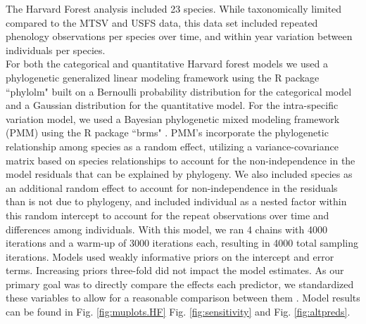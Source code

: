 \documentclass[11pt]{article}
\begin{document}
\noindent The Harvard Forest analysis included 23 species. While taxonomically limited compared to the MTSV and USFS data, this data set included repeated phenology observations per species over time, and within year variation between individuals per species. \\ 

\noindent For both the categorical and quantitative Harvard forest models we used a phylogenetic generalized linear modeling framework \citep{Ives2010} using the R package ``phylolm" \citep{Ho2014} built on a Bernoulli probability distribution for the categorical model and a Gaussian distribution for the quantitative model. For the intra-specific variation model, we used a Bayesian phylogenetic mixed modeling framework (PMM) \citep{Garamszegi2014} using the R package ``brms" \citep{Burkner2018}. PMM's incorporate the phylogenetic relationship among species as a random effect, utilizing a variance-covariance matrix based on species relationships to account for the non-independence in the model residuals that can be explained by phylogeny. We also included species as an additional random effect to account for non-independence in the residuals than is not due to phylogeny, and included individual as a nested factor within this random intercept to account for the repeat observations over time and differences among individuals. With this model, we ran 4 chains with 4000 iterations and a warm-up of 3000 iterations each, resulting in 4000 total sampling iterations. Models used weakly informative priors on the intercept and error terms. Increasing priors three-fold did not impact the model estimates. As our primary goal was to directly compare the effects each predictor, we standardized these variables to allow for a reasonable comparison between them {\citep{Gelman2007}. Model results can be found in Fig. \ref{fig:muplots.HF} Fig. \ref{fig:sensitivity} and Fig. \ref{fig:altpreds}.\\

}
\end{document}
